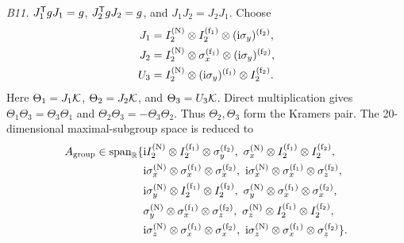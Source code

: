 \medskip\noindent\textit{B11.}\quad
\(J_1^{\mathsf{T}} gJ_1=g\), \(J_2^{\mathsf{T}} gJ_2=g\), and
\(J_1J_2=J_2J_1\).
Choose
\begin{equation*}
\begin{aligned}
J_1&=I_2^{({\rm N})}\otimes I_2^{({\rm f}_1)}
       \otimes(\mathrm{i}\sigma_y)^{({\rm f}_2)},\\
J_2&=I_2^{({\rm N})}\otimes\sigma_x^{({\rm f}_1)}
       \otimes(\mathrm{i}\sigma_y)^{({\rm f}_2)},\\
U_3&=I_2^{({\rm N})}\otimes(\mathrm{i}\sigma_y)^{({\rm f}_1)}
       \otimes I_2^{({\rm f}_2)} .
\end{aligned}
\end{equation*}
Here \(\Theta_1=J_1\mathcal{K}\), \(\Theta_2=J_2\mathcal{K}\), and
\(\Theta_3=U_3\mathcal{K}\).  Direct multiplication gives
\(\Theta_1\Theta_3=\Theta_3\Theta_1\) and
\(\Theta_2\Theta_3=-\Theta_3\Theta_2\).  Thus \(\Theta_2,\Theta_3\)
form the Kramers pair.  The 20-dimensional maximal-subgroup space is reduced to
\begin{align*}
A_{\rm group}\in\operatorname{span}_{\mathbb R}\{&
\mathrm{i} I_2^{({\rm N})}\otimes I_2^{({\rm f}_1)}\otimes\sigma_y^{({\rm f}_2)},
\ \sigma_x^{({\rm N})}\otimes I_2^{({\rm f}_1)}\otimes I_2^{({\rm f}_2)},\\
&\mathrm{i}\sigma_x^{({\rm N})}\otimes\sigma_x^{({\rm f}_1)}\otimes\sigma_x^{({\rm f}_2)},
\ \mathrm{i}\sigma_x^{({\rm N})}\otimes\sigma_x^{({\rm f}_1)}\otimes\sigma_z^{({\rm f}_2)},\\
&\mathrm{i}\sigma_y^{({\rm N})}\otimes I_2^{({\rm f}_1)}\otimes I_2^{({\rm f}_2)},
\ \sigma_y^{({\rm N})}\otimes\sigma_x^{({\rm f}_1)}\otimes\sigma_x^{({\rm f}_2)},\\
&\sigma_y^{({\rm N})}\otimes\sigma_x^{({\rm f}_1)}\otimes\sigma_z^{({\rm f}_2)},
\ \sigma_z^{({\rm N})}\otimes I_2^{({\rm f}_1)}\otimes I_2^{({\rm f}_2)},\\
&\mathrm{i}\sigma_z^{({\rm N})}\otimes\sigma_x^{({\rm f}_1)}\otimes\sigma_x^{({\rm f}_2)},
\ \mathrm{i}\sigma_z^{({\rm N})}\otimes\sigma_x^{({\rm f}_1)}\otimes\sigma_z^{({\rm f}_2)}
\}.
\end{align*}

